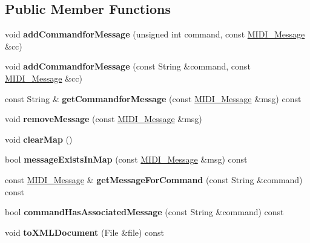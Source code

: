 \subsection*{Public Member Functions}
\begin{DoxyCompactItemize}
\item 
void {\bfseries add\+Commandfor\+Message} (unsigned int command, const \hyperlink{struct_m_i_d_i___message}{M\+I\+D\+I\+\_\+\+Message} \&cc)\hypertarget{class_command_map_a3b44b67f2167475bba282b8a185018c6}{}\label{class_command_map_a3b44b67f2167475bba282b8a185018c6}

\item 
void {\bfseries add\+Commandfor\+Message} (const String \&command, const \hyperlink{struct_m_i_d_i___message}{M\+I\+D\+I\+\_\+\+Message} \&cc)\hypertarget{class_command_map_a101a5cb39f2f28f16b56a3e782c9daab}{}\label{class_command_map_a101a5cb39f2f28f16b56a3e782c9daab}

\item 
const String \& {\bfseries get\+Commandfor\+Message} (const \hyperlink{struct_m_i_d_i___message}{M\+I\+D\+I\+\_\+\+Message} \&msg) const \hypertarget{class_command_map_aa7b751c5f0b16fb5f552b5c304f56c68}{}\label{class_command_map_aa7b751c5f0b16fb5f552b5c304f56c68}

\item 
void {\bfseries remove\+Message} (const \hyperlink{struct_m_i_d_i___message}{M\+I\+D\+I\+\_\+\+Message} \&msg)\hypertarget{class_command_map_a4965760cbda2b82484b26f5df645c216}{}\label{class_command_map_a4965760cbda2b82484b26f5df645c216}

\item 
void {\bfseries clear\+Map} ()\hypertarget{class_command_map_a628b909ed621f43bc42557bc488a6087}{}\label{class_command_map_a628b909ed621f43bc42557bc488a6087}

\item 
bool {\bfseries message\+Exists\+In\+Map} (const \hyperlink{struct_m_i_d_i___message}{M\+I\+D\+I\+\_\+\+Message} \&msg) const \hypertarget{class_command_map_a72d2cbd00ada2715b07945253f00b8e7}{}\label{class_command_map_a72d2cbd00ada2715b07945253f00b8e7}

\item 
const \hyperlink{struct_m_i_d_i___message}{M\+I\+D\+I\+\_\+\+Message} \& {\bfseries get\+Message\+For\+Command} (const String \&command) const \hypertarget{class_command_map_aeeef81aa7e1103a9e1012f2f4df35213}{}\label{class_command_map_aeeef81aa7e1103a9e1012f2f4df35213}

\item 
bool {\bfseries command\+Has\+Associated\+Message} (const String \&command) const \hypertarget{class_command_map_af295badce32ec027c9a4addef8c05bc2}{}\label{class_command_map_af295badce32ec027c9a4addef8c05bc2}

\item 
void {\bfseries to\+X\+M\+L\+Document} (File \&file) const \hypertarget{class_command_map_a86d35079d4397908aa26109e03e67c24}{}\label{class_command_map_a86d35079d4397908aa26109e03e67c24}

\end{DoxyCompactItemize}

